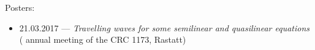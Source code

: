 \noindent Posters:
\begin{itemize}
  \item 21.03.2017 --- \textsl{Travelling waves for some semilinear and quasilinear equations}  ( annual meeting of the CRC 1173, Rastatt)
\end{itemize}
